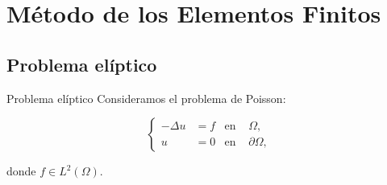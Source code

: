\section{Método de los Elementos Finitos}

\subsection{Problema elíptico}

\begin{frame}{Problema elíptico}
Consideramos el problema de Poisson:
\begin{block}{}
\begin{equation*}
\label{prob_modelo_Poisson}
\left\{
\begin{aligned}
-\Delta u&=f & \text{en } &\Omega, \\
u&=0 & \text{en } &\partial\Omega,
\end{aligned}
\right.
\end{equation*}
\end{block}
donde $f\in L^2\left(\Omega\right)$.
\end{frame}


